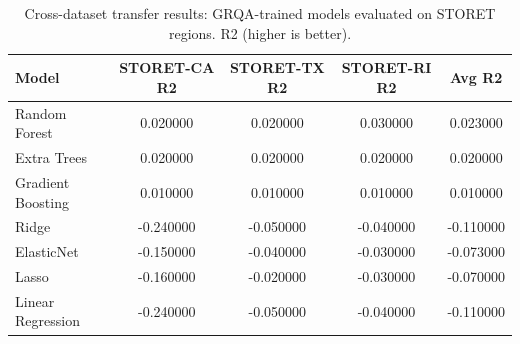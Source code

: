 \begin{table}
\caption{Cross-dataset transfer results: GRQA-trained models evaluated on STORET regions. R2 (higher is better).}
\label{tab:transfer}
\begin{tabular}{lcccc}
\toprule
Model & STORET-CA R2 & STORET-TX R2 & STORET-RI R2 & Avg R2 \\
\midrule
Random Forest & 0.020000 & 0.020000 & 0.030000 & 0.023000 \\
Extra Trees & 0.020000 & 0.020000 & 0.020000 & 0.020000 \\
Gradient Boosting & 0.010000 & 0.010000 & 0.010000 & 0.010000 \\
Ridge & -0.240000 & -0.050000 & -0.040000 & -0.110000 \\
ElasticNet & -0.150000 & -0.040000 & -0.030000 & -0.073000 \\
Lasso & -0.160000 & -0.020000 & -0.030000 & -0.070000 \\
Linear Regression & -0.240000 & -0.050000 & -0.040000 & -0.110000 \\
\bottomrule
\end{tabular}
\end{table}
